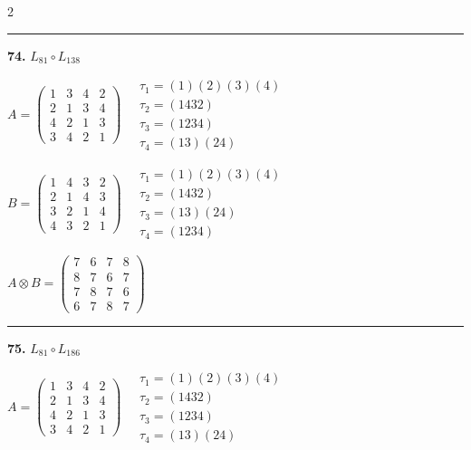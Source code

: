 \begin{multicols}{2}
\vspace{0.3em}
\hrule
\vspace{0.3em}

\noindent\textbf{74.} $L_{81} \circ L_{138}$

$A = \begin{pmatrix} 1 & 3 & 4 & 2 \\ 2 & 1 & 3 & 4 \\ 4 & 2 & 1 & 3 \\ 3 & 4 & 2 & 1 \end{pmatrix} \quad \begin{matrix} \tau_{1}=(1)(2)(3)(4) \\ \tau_{2}=(1 4 3 2) \\ \tau_{3}=(1 2 3 4) \\ \tau_{4}=(1 3)(2 4) \end{matrix}$

$B = \begin{pmatrix} 1 & 4 & 3 & 2 \\ 2 & 1 & 4 & 3 \\ 3 & 2 & 1 & 4 \\ 4 & 3 & 2 & 1 \end{pmatrix} \quad \begin{matrix} \tau_{1}=(1)(2)(3)(4) \\ \tau_{2}=(1 4 3 2) \\ \tau_{3}=(1 3)(2 4) \\ \tau_{4}=(1 2 3 4) \end{matrix}$

$A \otimes B = \begin{pmatrix} 7 & 6 & 7 & 8 \\ 8 & 7 & 6 & 7 \\ 7 & 8 & 7 & 6 \\ 6 & 7 & 8 & 7 \end{pmatrix}$

\vspace{0.3em}
\hrule
\vspace{0.3em}

\noindent\textbf{75.} $L_{81} \circ L_{186}$

$A = \begin{pmatrix} 1 & 3 & 4 & 2 \\ 2 & 1 & 3 & 4 \\ 4 & 2 & 1 & 3 \\ 3 & 4 & 2 & 1 \end{pmatrix} \quad \begin{matrix} \tau_{1}=(1)(2)(3)(4) \\ \tau_{2}=(1 4 3 2) \\ \tau_{3}=(1 2 3 4) \\ \tau_{4}=(1 3)(2 4) \end{matrix}$


\end{multicols}

